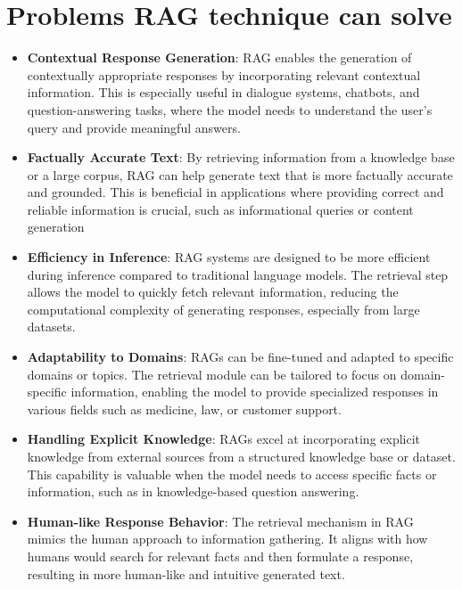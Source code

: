 \documentclass[../main.tex]{subfiles}
\begin{document}
\section{Problems RAG technique can solve}
\begin{itemize}
	\item{\textbf{Contextual Response Generation}: RAG enables the generation of contextually appropriate responses by incorporating relevant contextual information. This is especially useful in dialogue systems, chatbots, and question-answering tasks, where the model needs to understand the user's query and provide meaningful answers.}
	\item{\textbf{Factually Accurate Text}: By retrieving information from a knowledge base or a large corpus, RAG can help generate text that is more factually accurate and grounded. This is beneficial in applications where providing correct and reliable information is crucial, such as informational queries or content generation}
	\item{\textbf{Efficiency in Inference}: RAG systems are designed to be more efficient during inference compared to traditional language models. The retrieval step allows the model to quickly fetch relevant information, reducing the computational complexity of generating responses, especially from large datasets.}
	\item{\textbf{Adaptability to Domains}: RAGs can be fine-tuned and adapted to specific domains or topics. The retrieval module can be tailored to focus on domain-specific information, enabling the model to provide specialized responses in various fields such as medicine, law, or customer support.}
	\item{\textbf{Handling Explicit Knowledge}: RAGs excel at incorporating explicit knowledge from external sources from a structured knowledge base or dataset. This capability is valuable when the model needs to access specific facts or information, such as in knowledge-based question answering.}
	\item{\textbf{Human-like Response Behavior}: The retrieval mechanism in RAG mimics the human approach to information gathering. It aligns with how humans would search for relevant facts and then formulate a response, resulting in more human-like and intuitive generated text.}
\end{itemize}
\end{document}
